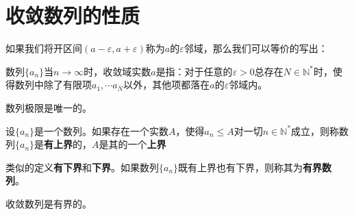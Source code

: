 
\section{收敛数列的性质}

如果我们将开区间\((a-\varepsilon, a+\varepsilon)\)称为\(a\)的\(\varepsilon\)邻域，那么我们可以等价的写出：

\begin{definition}[数列收敛的邻域定义]
	数列\(\{a_n\}\)当\(n\rightarrow \infty\)时，收敛域实数\(a\)是指：对于任意的\(\varepsilon>0\)总存在\(N\in \mathbb N^*\)时，使得数列中除了有限项\(a_1,\cdots a_N\)以外，其他项都落在\(a\)的\(\varepsilon\)邻域内。
\end{definition}

\begin{theorem}[唯一性]
	数列极限是唯一的。
\end{theorem}


\begin{definition}[上界]
	设\(\{a_n\}\)是一个数列。如果存在一个实数\(A\)，使得\(a_n\le A\)对一切\(n\in \mathbb N^*\)成立，则称数列\(\{a_n\}\)是\textbf{有上界}的，\(A\)是其的一个\textbf{上界}
\end{definition}


类似的定义\textbf{有下界}和\textbf{下界}。如果数列\(\{a_n\}\)既有上界也有下界，则称其为\textbf{有界数列}。

\begin{theorem}[有界性]
	收敛数列是有界的。
\end{theorem}


